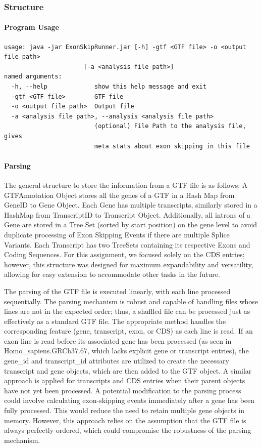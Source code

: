 \documentclass{article}
\begin{document}
    \subsubsection{Structure}

    \paragraph{Program Usage}
    \begin{verbatim}
usage: java -jar ExonSkipRunner.jar [-h] -gtf <GTF file> -o <output file path>
                      [-a <analysis file path>]
named arguments:
  -h, --help             show this help message and exit
  -gtf <GTF file>        GTF file
  -o <output file path>  Output file
  -a <analysis file path>, --analysis <analysis file path>
                         (optional) File Path to the analysis file, gives
                         meta stats about exon skipping in this file
    \end{verbatim}

    \paragraph{Parsing}
    The general structure to store the information from a GTF file is as follows: A GTFAnnotation Object stores all the genes of a GTF in a Hash Map from GeneID to Gene Object. Each Gene has multiple transcripts, similarly stored in a HashMap from TranscriptID to Transcript Object. Additionally, all introns of a Gene are stored in a Tree Set (sorted by start position) on the gene level to avoid duplicate processing of Exon Skipping Events if there are multiple Splice Variants. Each Transcript has two TreeSets containing its respective Exons and Coding Sequences. For this assignment, we focused solely on the CDS entries; however, this structure was designed for maximum expandability and versatility, allowing for easy extension to accommodate other tasks in the future.

    The parsing of the GTF file is executed linearly, with each line processed sequentially. The parsing mechanism is robust and capable of handling files whose lines are not in the expected order; thus, a shuffled file can be processed just as effectively as a standard GTF file. The appropriate method handles the corresponding feature (gene, transcript, exon, or CDS) as each line is read. If an exon line is read before its associated gene has been processed (as seen in Homo\_sapiens.GRCh37.67, which lacks explicit gene or transcript entries), the gene\_id and transcript\_id attributes are utilized to create the necessary transcript and gene objects, which are then added to the GTF object. A similar approach is applied for transcripts and CDS entries when their parent objects have not yet been processed. A potential modification to the parsing process could involve calculating exon-skipping events immediately after a gene has been fully processed. This would reduce the need to retain multiple gene objects in memory. However, this approach relies on the assumption that the GTF file is always perfectly ordered, which could compromise the robustness of the parsing mechanism.
\end{document}
